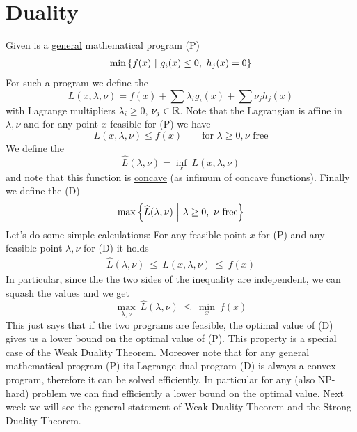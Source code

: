 \documentclass[answers]{exam}
\begin{document}
    \section{Duality}
    Given is a \underline{general} mathematical program (P)
    \begin{align*}
        \min\left\{f(x) \ \middle|\ g_i(x)\leq 0,\ h_j(x) = 0\right\}
    \end{align*}
    For such a program we define the  
    $$ L(x,\lambda, \nu) = f(x) + \sum \lambda_i g_i(x) + \sum \nu_j h_j(x) $$
    with Lagrange multipliers $\lambda_i\geq 0$, $\nu_j\in \mathbb{R}$. Note that the Lagrangian is affine in $\lambda, \nu$ and for any point $x$ feasible for (P) we have 
    $$ L(x,\lambda, \nu) \leq f(x) \quad\quad \text{for } \lambda\geq 0, \nu \text{ free} $$
    We define the  
    $$ \hat{L}(\lambda, \nu) = \inf_{x}\ L(x,\lambda, \nu) $$
    and note that this function is \underline{concave} (as infimum of concave functions). Finally we define the  (D) 
    \begin{align*}
        \max\left\{\widehat{L}(\lambda, \nu) \ \middle|\ \lambda \geq 0,\ \nu \text{ free}\right\}
    \end{align*}
    Let's do some simple calculations: For any feasible point $x$ for (P) and any feasible point $\lambda, \nu$ for (D) it holds
    \begin{align*}
        \hat{L}(\lambda, \nu)\ \leq\ L(x,\lambda, \nu)\ \leq\ f(x)
    \end{align*}
    In particular, since the the two sides of the inequality are independent, we can squash the values and we get 
    $$ \max_{\lambda, \nu}\ \hat{L}(\lambda, \nu)\ \leq\ \min_{x}\ f(x) $$
    This just says that if the two programs are feasible, the optimal value of (D) gives us a lower bound on the optimal value of (P). This property is a special case of the \underline{Weak Duality Theorem}. Moreover note that for any general mathematical program (P) its Lagrange dual program (D) is always a convex program, therefore it can be solved efficiently. In particular for any (also NP-hard) problem we can find efficiently a lower bound on the optimal value. Next week we will see the general statement of Weak Duality Theorem and the Strong Duality Theorem. 
\end{document}
